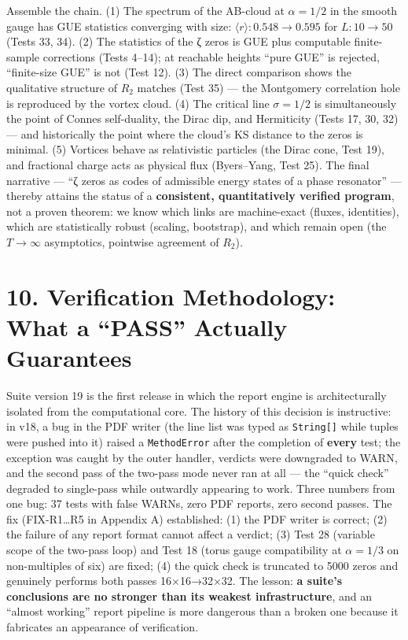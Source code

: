 \documentclass[
]{article}
\begin{document}
Assemble the chain. (1) The spectrum of the AB-cloud at \(\alpha=1/2\)
in the smooth gauge has GUE statistics converging with size:
\(\langle r\rangle: 0.548\to0.595\) for \(L: 10\to50\) (Tests 33, 34).
(2) The statistics of the ζ zeros is GUE plus computable finite-sample
corrections (Tests 4--14); at reachable heights ``pure GUE'' is
rejected, ``finite-size GUE'' is not (Test 12). (3) The direct
comparison shows the qualitative structure of \(R_2\) matches (Test 35)
--- the Montgomery correlation hole is reproduced by the vortex cloud.
(4) The critical line \(\sigma=1/2\) is simultaneously the point of
Connes self-duality, the Dirac dip, and Hermiticity (Tests 17, 30, 32)
--- and historically the point where the cloud's KS distance to the
zeros is minimal. (5) Vortices behave as relativistic particles (the
Dirac cone, Test 19), and fractional charge acts as physical flux
(Byers--Yang, Test 25). The final narrative --- ``ζ zeros as codes of
admissible energy states of a phase resonator'' --- thereby attains the
status of a \textbf{consistent, quantitatively verified program}, not a
proven theorem: we know which links are machine-exact (fluxes,
identities), which are statistically robust (scaling, bootstrap), and
which remain open (the \(T\to\infty\) asymptotics, pointwise agreement
of \(R_2\)).

\section{10. Verification Methodology: What a ``PASS'' Actually
Guarantees}\label{verification-methodology-what-a-pass-actually-guarantees}

Suite version 19 is the first release in which the report engine is
architecturally isolated from the computational core. The history of
this decision is instructive: in v18, a bug in the PDF writer (the line
list was typed as \texttt{String{[}{]}} while tuples were pushed into
it) raised a \texttt{MethodError} after the completion of \textbf{every}
test; the exception was caught by the outer handler, verdicts were
downgraded to WARN, and the second pass of the two-pass mode never ran
at all --- the ``quick check'' degraded to single-pass while outwardly
appearing to work. Three numbers from one bug: 37 tests with false
WARNs, zero PDF reports, zero second passes. The fix (FIX-R1\ldots R5 in
Appendix A) established: (1) the PDF writer is correct; (2) the failure
of any report format cannot affect a verdict; (3) Test 28 (variable
scope of the two-pass loop) and Test 18 (torus gauge compatibility at
\(\alpha=1/3\) on non-multiples of six) are fixed; (4) the quick check
is truncated to 5000 zeros and genuinely performs both passes
16×16→32×32. The lesson: \textbf{a suite's conclusions are no stronger
than its weakest infrastructure}, and an ``almost working'' report
pipeline is more dangerous than a broken one because it fabricates an
appearance of verification.
\end{document}

